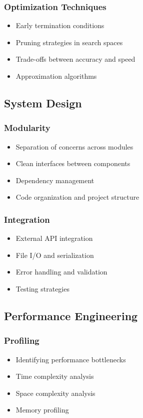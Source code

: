 \documentclass[12pt,a4paper]{article}
\begin{document}
\subsubsection{Optimization Techniques}
\begin{itemize}
    \item Early termination conditions
    \item Pruning strategies in search spaces
    \item Trade-offs between accuracy and speed
    \item Approximation algorithms
\end{itemize}

\subsection{System Design}

\subsubsection{Modularity}
\begin{itemize}
    \item Separation of concerns across modules
    \item Clean interfaces between components
    \item Dependency management
    \item Code organization and project structure
\end{itemize}

\subsubsection{Integration}
\begin{itemize}
    \item External API integration
    \item File I/O and serialization
    \item Error handling and validation
    \item Testing strategies
\end{itemize}

\subsection{Performance Engineering}

\subsubsection{Profiling}
\begin{itemize}
    \item Identifying performance bottlenecks
    \item Time complexity analysis
    \item Space complexity analysis
    \item Memory profiling
\end{itemize}
\end{document}
